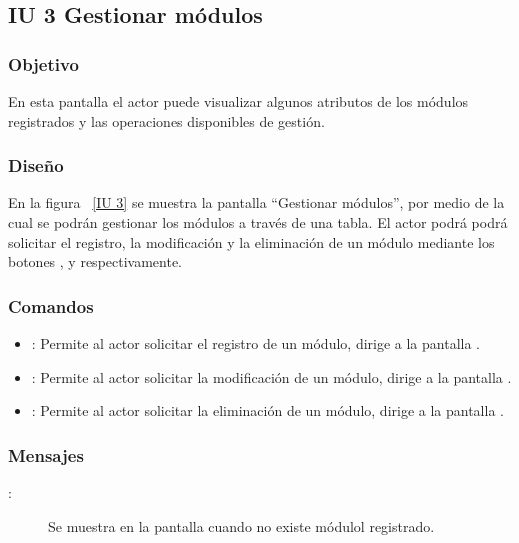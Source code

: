 \subsection{IU 3 Gestionar módulos}
\subsubsection{Objetivo}
	
	En esta pantalla el actor puede visualizar algunos atributos de los módulos registrados y las operaciones disponibles de gestión.

\subsubsection{Diseño}

    En la figura ~\ref{IU 3} se muestra la pantalla ``Gestionar módulos'', por medio de la cual 
    se podrán gestionar los módulos a través de una tabla. El actor podrá podrá solicitar el registro, la modificación y la eliminación 
    de un módulo mediante los botones
    , \btnEditar y \btnEliminar respectivamente. \\



\subsubsection{Comandos}
\begin{itemize}
	\item {}: Permite al actor solicitar el registro de un módulo, dirige a la pantalla .
	\item \btnEditar[Modificar]: Permite al actor solicitar la modificación de un módulo, dirige a la pantalla .
	\item \btnEliminar[Eliminar]: Permite al actor solicitar la eliminación de un módulo, dirige a la pantalla .
\end{itemize}
\subsubsection{Mensajes}
	
\begin{description}
	\item[:] Se muestra en la pantalla  cuando no existe módulol registrado.
\end{description}
